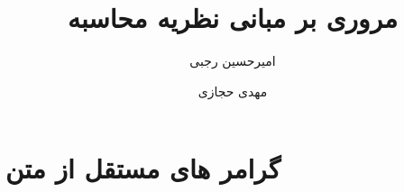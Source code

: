 \documentclass{article}
\title{مروری بر مبانی نظریه محاسبه}
\author{
	امیرحسین رجبی
	\and
	مهدی حجازی
}
\date{}
\begin{document}
	\maketitle
	
	\doublespacing
	
	\section{
	گرامر های مستقل از متن
	\protect{}
	}
	
	
	
 
\end{document}
